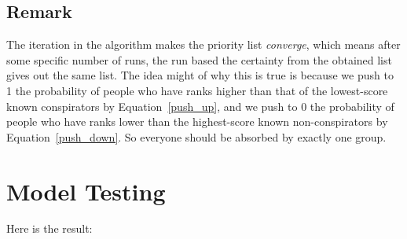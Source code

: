 \documentclass{icmmcm}
\begin{document}
\subsection{Remark}
The iteration in the algorithm makes the priority list 
\textit{converge}, which means after some specific
number of runs, the run based the certainty from the obtained list gives out the same list.
The idea might of why this is true is because we push to 1 the 
probability of people who have
ranks higher than that of the lowest-score known conspirators
by Equation~\eqref{push_up}, and we push to 0 the 
probability of people who have ranks lower than the highest-score known non-conspirators by Equation~\eqref{push_down}.
So everyone should be absorbed by exactly one group. 

\section{Model Testing}

Here is the result:
\end{document}
